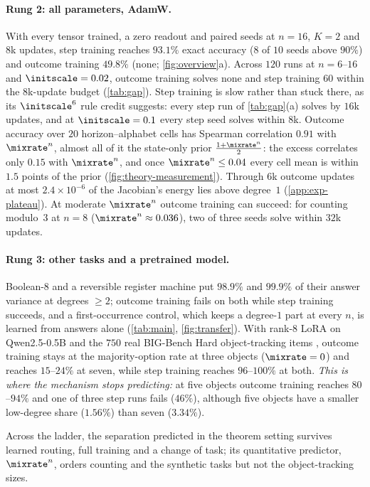 \paragraph{Rung 2: all parameters, AdamW.} With every tensor trained, a zero readout and paired seeds at $n=16$, $K=2$ and $8$k
updates, step training reaches $93.1\%$ exact accuracy ($8$ of $10$ seeds above $90\%$) and outcome training $49.8\%$ (none;
\cref{fig:overview}a). Across $120$ runs at $n=6$--$16$ and $\initscale=0.02$, outcome training solves none and step training $60$ within the $8$k-update budget
(\cref{tab:gap}). Step training is slow rather than stuck there, as its $\initscale^6$ rule credit suggests: every step run of
\cref{tab:gap}(a) solves by $16$k updates, and at $\initscale=0.1$ every step seed solves within $8$k. Outcome
accuracy over $20$ horizon--alphabet cells has Spearman correlation $0.91$ with $\mixrate^n$, almost all of it the state-only prior
$\frac{1+\mixrate^n}{2}$: the excess correlates only $0.15$ with $\mixrate^n$, and once $\mixrate^n\le0.04$ every cell mean is within $1.5$
points of the prior (\cref{fig:theory-measurement}). Through $6$k outcome updates at most $2.4\times10^{-6}$ of the Jacobian's energy
lies above degree~$1$ (\cref{app:exp-plateau}). At moderate $\mixrate^n$ outcome training can succeed: for counting modulo~$3$ at $n=8$
($\mixrate^n\approx0.036$), two of three seeds solve within $32$k updates.

\paragraph{Rung 3: other tasks and a pretrained model.} Boolean-8 and a reversible register machine put $98.9\%$ and $99.9\%$ of their
answer variance at degrees $\ge2$; outcome training fails on both while step training succeeds, and a first-occurrence control, which
keeps a degree-$1$ part at every $n$, is learned from answers alone (\cref{tab:main}, \cref{fig:transfer}). With rank-8 LoRA on
Qwen2.5-0.5B and the $750$ real BIG-Bench Hard object-tracking items \citep{suzgun2022challenging}, outcome training stays at the
majority-option rate at three objects ($\mixrate=0$) and reaches $15$--$24\%$ at seven, while step training reaches $96$--$100\%$ at both.
\emph{This is where the mechanism stops predicting:} at five objects outcome training reaches $80$--$94\%$ and one of three step runs fails
($46\%$), although five objects have a smaller low-degree share ($1.56\%$) than seven ($3.34\%$).

Across the ladder, the separation predicted in the theorem setting survives learned routing, full training and a change of task; its
quantitative predictor, $\mixrate^n$, orders counting and the synthetic tasks but not the object-tracking sizes.


